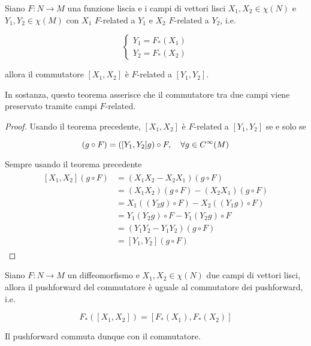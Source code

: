 \begin{theorem}
	Siano $ F : N \to M $ una funzione liscia e i campi di vettori lisci $ X_{1},X_{2} \in \chi(N) $ e $ Y_{1},Y_{2} \in \chi(M) $ con $ X_{1} $ $ F $-related a $ Y_{1} $ e $ X_{2} $ $ F $-related a $ Y_{2} $, i.e.
	
	\begin{equation}
		\begin{cases}
			Y_{1} = F_{*}(X_{1}) \\
			Y_{2} = F_{*}(X_{2})
		\end{cases}
	\end{equation}

	allora il commutatore $ [X_{1},X_{2}] $ è $ F $-related a $ [Y_{1},Y_{2}] $.
\end{theorem}

In sostanza, questo teorema asserisce che il commutatore tra due campi viene preservato tramite campi $ F $-related.

\begin{proof}
	Usando il teorema precedente, $ [X_{1},X_{2}] $ è $ F $-related a $ [Y_{1},Y_{2}] $ se e solo se
	
	\begin{equation}
		[X_{1},X_{2}](g \circ F) = ([Y_{1},Y_{2}] g) \circ F \qcomma \forall g \in C^{\infty}(M)
	\end{equation}

	Sempre usando il teorema precedente
	\begin{align}
		\begin{split}
			[X_{1},X_{2}](g \circ F) &= (X_{1} X_{2} - X_{2} X_{1})(g \circ F) \\
			&= (X_{1} X_{2})(g \circ F) - (X_{2} X_{1})(g \circ F) \\
			&= X_{1}((Y_{2} g) \circ F) - X_{2}((Y_{1} g) \circ F) \\
			&= Y_{1}(Y_{2} g) \circ F - Y_{1}(Y_{2} g) \circ F \\
			&= (Y_{1} Y_{2} - Y_{1} Y_{2})(g \circ F) \\
			&= [Y_{1},Y_{2}](g \circ F)
		\end{split}
	\end{align}
\end{proof}

\begin{corollary}\label{cor:f-rel-brack}
	Siano $ F : N \to M $ un diffeomorfismo e $ X_{1},X_{2} \in \chi(N) $ due campi di vettori lisci, allora il pushforward del commutatore è uguale al commutatore dei pushforward, i.e.
	
	\begin{equation}
		F_{*} ([X_{1},X_{2}]) = [F_{*} (X_{1}),F_{*} (X_{2})]
	\end{equation}

	Il pushforward commuta dunque con il commutatore.
\end{corollary}

